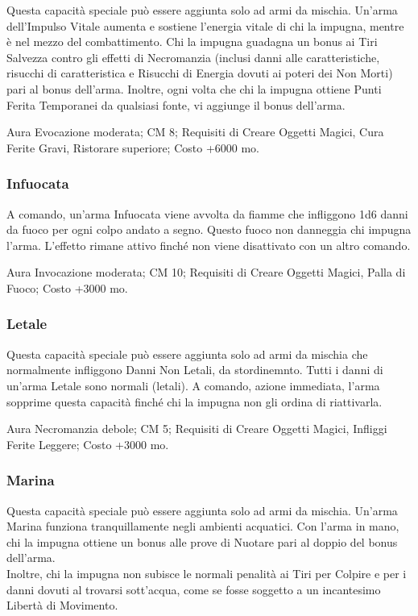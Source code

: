 \begin{multicols}{2}
Questa capacità speciale può essere aggiunta solo ad armi da mischia. Un'arma dell'Impulso Vitale aumenta e sostiene l'energia vitale di chi la impugna, mentre è nel mezzo del combattimento. Chi la impugna guadagna un bonus ai Tiri Salvezza contro gli effetti di Necromanzia (inclusi danni alle caratteristiche, risucchi di caratteristica e Risucchi di Energia dovuti ai poteri dei Non Morti) pari al bonus dell'arma. Inoltre, ogni volta che chi la impugna ottiene Punti Ferita Temporanei da qualsiasi fonte, vi aggiunge il bonus dell'arma.

Aura Evocazione moderata; CM 8; Requisiti di Creare Oggetti Magici, Cura Ferite Gravi, Ristorare superiore; Costo +6000 mo.

\subsubsection{Infuocata}

A comando, un'arma Infuocata viene avvolta da fiamme che infliggono 1d6 danni da fuoco per ogni colpo andato a segno. Questo fuoco non danneggia chi impugna l'arma. L'effetto rimane attivo finché non viene disattivato con un altro comando.

Aura Invocazione moderata; CM 10; Requisiti di Creare Oggetti Magici, Palla di Fuoco; Costo +3000 mo.

\subsubsection{Letale}

Questa capacità speciale può essere aggiunta solo ad armi da mischia che normalmente infliggono Danni Non Letali, da stordinemnto. Tutti i danni di un'arma Letale sono normali (letali). A comando, azione immediata, l'arma sopprime questa capacità finché chi la impugna non gli ordina di riattivarla.

Aura Necromanzia debole; CM 5; Requisiti di Creare Oggetti Magici, Infliggi Ferite Leggere; Costo +3000 mo.

\subsubsection{Marina}

Questa capacità speciale può essere aggiunta solo ad armi da mischia. Un'arma Marina funziona tranquillamente negli ambienti acquatici. Con l'arma in mano, chi la impugna ottiene un bonus alle prove di Nuotare pari al doppio del bonus dell'arma. \\
Inoltre, chi la impugna non subisce le normali penalità ai Tiri per Colpire e per i danni dovuti al trovarsi sott'acqua, come se fosse soggetto a un incantesimo Libertà di Movimento.


\end{multicols}
